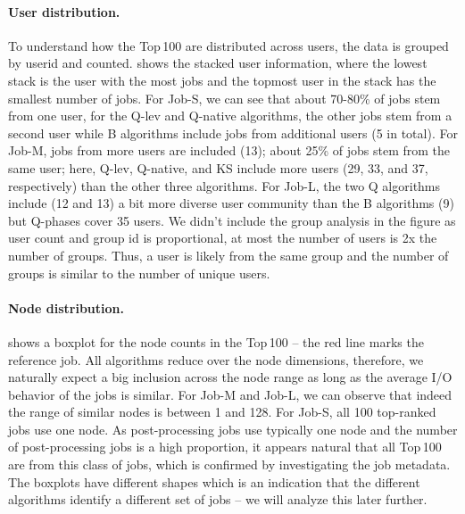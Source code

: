 \documentclass{jhps}
\begin{document}
\paragraph{User distribution.}
To understand how the Top\,100 are distributed across users, the data is grouped by userid and counted.
 shows the stacked user information, where the lowest stack is the user with the most jobs and the topmost user in the stack has the smallest number of jobs.
For Job-S, we can see that about 70-80\% of jobs stem from one user, for the Q-lev and Q-native algorithms, the other jobs stem from a second user while B algorithms include jobs from additional users (5 in total).
For Job-M, jobs from more users are included (13); about 25\% of jobs stem from the same user; here, Q-lev, Q-native, and KS include more users (29, 33, and 37, respectively) than the other three algorithms.
For Job-L, the two Q algorithms include (12 and 13) a bit more diverse user community than the B algorithms (9) but Q-phases cover 35 users.
We didn't include the group analysis in the figure as user count and group id is proportional, at most the number of users is 2x the number of groups.
Thus, a user is likely from the same group and the number of groups is similar to the number of unique users.

\paragraph{Node distribution.}
 shows a boxplot for the node counts in the Top\,100 -- the red line marks the reference job.
All algorithms reduce over the node dimensions, therefore, we naturally expect a big inclusion across the node range as long as the average I/O behavior of the jobs is similar.
For Job-M and Job-L, we can observe that indeed the range of similar nodes is between 1 and 128.
For Job-S, all 100 top-ranked jobs use one node.
As post-processing jobs use typically one node and the number of post-processing jobs is a high proportion, it appears natural that all Top\,100 are from this class of jobs, which is confirmed by investigating the job metadata.
The boxplots have different shapes which is an indication that the different algorithms identify a different set of jobs -- we will analyze this later further.
\end{document}
